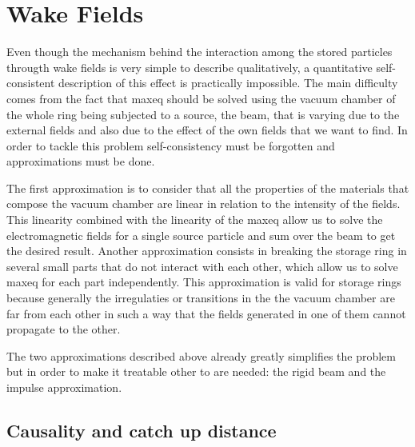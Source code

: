 \documentclass[
	12pt,				%
	openright,			%
	oneside,			%
	a4paper,		%
	chapter=TITLE,		%
	section=TITLE,		%
    brazil,				%
	english,			%
	sumario=tradicional,
	]{abntex2}
\begin{document}
  \section{Wake Fields}

  Even though the mechanism behind the interaction among the stored particles througth wake fields is very simple to describe qualitatively, a quantitative self-consistent description of this effect is practically impossible. The main difficulty comes from the fact that \gls{maxeq} should be solved using the vacuum chamber of the whole ring being subjected to a source, the beam, that is varying due to the external fields and also due to the effect of the own fields that we want to find. In order to tackle this problem self-consistency must be forgotten and approximations must be done.

  The first approximation is to consider that all the properties of the materials that compose the vacuum chamber are linear in relation to the intensity of the fields. This linearity combined with the linearity of the \gls{maxeq} allow us to solve the electromagnetic fields for a single source particle and sum over the beam to get the desired result. Another approximation consists in breaking the storage ring in several small parts that do not interact with each other, which allow us to solve \gls{maxeq} for each part independently. This approximation is valid for storage rings because generally the irregulaties or transitions in the the vacuum chamber are far from each other in such a way that the fields generated in one of them cannot propagate to the other.

  The two approximations described above already greatly simplifies the problem but in order to make it treatable other to are needed: the rigid beam and the impulse approximation.



\subsection{Causality and catch up distance}
\end{document}
